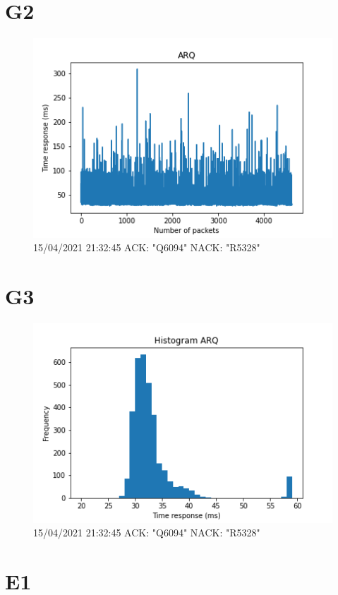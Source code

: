 \documentclass[hidelinks, 12pt, a4paper]{article}
\begin{document}
\pagebreak

\section{G2}

\begin{figure}[h!]
\centering
	\includegraphics[keepaspectratio, width=.8\textwidth]{arq.png}
	\caption{15/04/2021 21:32:45 ACK: "Q6094" NACK: "R5328"} 
\end{figure}


\section{G3}

\begin{figure}[h!]
\centering
	\includegraphics[keepaspectratio, width=.8\textwidth]{hist_arq.png}
	\caption{15/04/2021 21:32:45 ACK: "Q6094" NACK: "R5328"} 
\end{figure}

\pagebreak

\section{E1}
\end{document}
